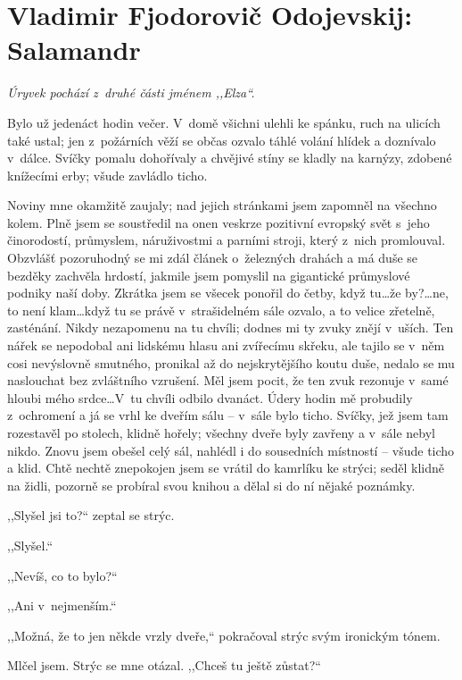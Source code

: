 \section{Vladimir Fjodorovič Odojevskij: Salamandr}

\noindent
\textit{Úryvek pochází z~druhé části jménem ,,Elza``.}

\medskip

\noindent
Bylo už jedenáct hodin večer. V domě všichni ulehli ke spánku, ruch na ulicích také ustal; jen z požárních věží se občas ozvalo táhlé volání hlídek a doznívalo v dálce. Svíčky pomalu dohořívaly a chvějivé stíny se kladly na karnýzy, zdobené knížecími erby; všude zavládlo ticho.

Noviny mne okamžitě zaujaly; nad jejich stránkami jsem zapomněl na všechno kolem. Plně jsem se soustředil na onen veskrze pozitivní evropský svět s jeho činorodostí, průmyslem, náruživostmi a parními stroji, který z nich promlouval. Obzvlášť pozoruhodný se mi zdál článek o~železných drahách a má duše se bezděky zachvěla hrdostí, jakmile jsem pomyslil na gigantické průmyslové podniky naší doby. Zkrátka jsem se všecek ponořil do četby, když tu\ldots že by?\ldots ne, to není klam\ldots když tu se právě v strašidelném sále ozvalo, a to velice zřetelně, zasténání. Nikdy nezapomenu na tu chvíli; dodnes mi ty zvuky znějí v uších. Ten nářek se nepodobal ani lidskému hlasu ani zvířecímu skřeku, ale tajilo se v něm cosi nevýslovně smutného, pronikal až do nejskrytějšího koutu duše, nedalo se mu naslouchat bez zvláštního vzrušení. Měl jsem pocit, že ten zvuk rezonuje v samé hloubi mého srdce\ldots V tu chvíli odbilo dvanáct. Údery hodin mě probudily z ochromení a já se vrhl ke dveřím sálu – v sále bylo ticho. Svíčky, jež jsem tam rozestavěl po stolech, klidně hořely; všechny dveře byly zavřeny a v sále nebyl nikdo. Znovu jsem obešel celý sál, nahlédl i do sousedních místností – všude ticho a klid. Chtě nechtě znepokojen jsem se vrátil do kamrlíku ke strýci; seděl klidně na židli, pozorně se probíral svou knihou a dělal si do ní nějaké poznámky.

,,Slyšel jsi to?`` zeptal se strýc.

,,Slyšel.``

,,Nevíš, co to bylo?``

,,Ani v nejmenším.``

,,Možná, že to jen někde vrzly dveře,`` pokračoval strýc svým ironickým tónem.

Mlčel jsem. Strýc se mne otázal. ,,Chceš tu ještě zůstat?``

